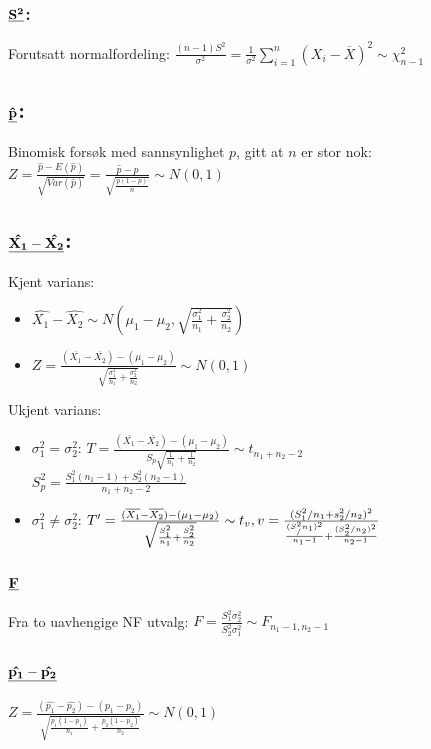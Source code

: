 \documentclass[12pt,a4paper,twocolumn,twoside]{article}
\begin{document}
\subsubsection*{$\bold{\underline{S^2}}$:}
Forutsatt normalfordeling:
$\frac{(n-1)S^2}{\sigma^2}=\frac{1}{\sigma^2}\sum_{i=1}^n(X_i-\overline{X})^2\sim\chi_{n-1}^2$
\subsection*{$\bold{\underline{\hat{p}}}$:}
Binomisk forsøk med sannsynlighet $p$, gitt at $n$ er stor nok:
$Z=\frac{\hat{p}-E(\hat{p})}{\sqrt{Var(\hat{p})}}=\frac{\hat{p}-p}{\sqrt{\frac{p(1-p)}{n}}}\sim N(0,1)$
\subsection*{$\bold{\underline{\hat{X_1}-\hat{X_2}}}$:}
Kjent varians:
\begin{itemize}
    \item $\hat{X_1}-\hat{X_2} \sim N\left(\mu_1-\mu_2,\sqrt{\frac{\sigma_1^2}{n_1}+\frac{\sigma_2^2}{n_2}}\right)$
    \item $Z=\frac{(\overline{X_1}-\overline{X_2})-(\mu_1-\mu_2)}{\sqrt{\frac{\sigma^2_1}{n_1}+\frac{\sigma^2_2}{n_2}}}\sim N(0,1)$
\end{itemize}
Ukjent varians:
\begin{itemize}[topsep=0pt,itemsep=0pt, partopsep=0pt]
    \item $\sigma^2_1=\sigma^2_2$: $T=\frac{(\overline{X_1}-\overline{X_2})-(\mu_1-\mu_2)}{S_p\sqrt{\frac{1}{n_1}+\frac{1}{n_2}}}\sim t_{n_1+n_2-2}$\\
            $S_p^2=\frac{S_1^2(n_1-1)+S_2^2(n_2-1)}{n_1+n_2-2}$
    \item $\sigma^2_1\neq\sigma^2_2$: $T'=\frac{(\overline{X_1}-\overline{X_2})-(\mu_1-\mu_2)}{\sqrt{\frac{S^2_1}{n_1}+\frac{S^2_2}{n_2}}}\sim t_v,\\ v=\frac{(S^2_1/n_1+s^2_2/n_2)^2}{\frac{(S^2_/n_1)^2}{n_1-1}+\frac{(S^2_2/n_2)^2}{n_2-1}}$
\end{itemize}
\subsection*{$\bold{\underline{F}}$}
Fra to uavhengige NF utvalg:
$F=\frac{S^2_1\sigma^2_2}{S^2_2\sigma^2_1}\sim F_{n_1-1,n_2-1}$
\subsection*{$\bold{\underline{\hat{p_1}-\hat{p_2}}}$}
$Z=\frac{(\hat{p_1}-\hat{p_2})-(p_1-p_2)}{\sqrt{\frac{p_1(1-p_1)}{n_1}+\frac{p_2(1-p_2)}{n_2}}}\sim N(0,1)$
\end{document}
